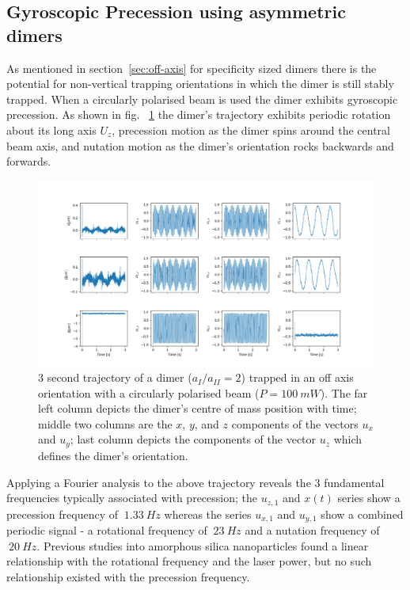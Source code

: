 \subsection{Gyroscopic Precession using asymmetric dimers}
As mentioned in section~\ref{sec:off-axis} for specificity sized dimers
there is the potential for non-vertical trapping orientations in which 
the dimer is still stably trapped. When a circularly polarised beam is 
used the dimer exhibits gyroscopic precession. As shown in fig.
~\ref{fig:gyro} the dimer's trajectory exhibits periodic rotation about 
its long axis $U_z$, precession motion as the dimer spins around the 
central beam axis, and nutation motion as the dimer's orientation rocks 
backwards and forwards. 
\begin{figure}[h]
	\centering
	\includegraphics[width=\linewidth]{gyroscopic_precession.png}
	\caption{3 second trajectory of a dimer ($a_{I}/a_{II}=2$) trapped in an 
		off axis orientation with a circularly polarised beam ($P= 100\ mW$). 
		The far left column depicts the dimer's centre of mass position with 
		time; middle two columns are the $x$, $y$, and $z$ components of the 
		vectors $u_x$ and $u_y$; last column depicts the components of the 
		vector $u_z$ which defines the dimer's orientation.}
	\label{fig:gyro}
\end{figure}

Applying a Fourier analysis to the above trajectory reveals the 3 fundamental
frequencies typically associated with precession; the $u_{z,1}$ and $x(t)$ 
series show a precession frequency of $~1.33\ Hz$ whereas the series $u_{x,1}$ 
and $u_{y,1}$ show a combined periodic signal - a rotational frequency of 
$~23\ Hz$ and a nutation frequency of $~20\ Hz$. Previous studies into 
amorphous silica nanoparticles found a linear relationship with the 
rotational frequency and the laser power, but no such relationship existed 
with the precession frequency.

